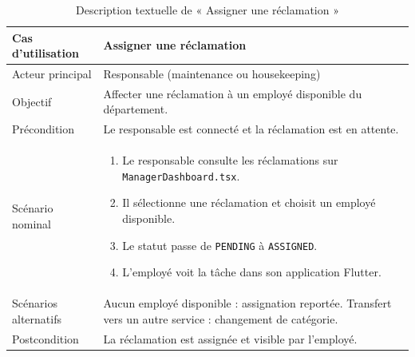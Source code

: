 \begin{table}[H]
\centering
\caption{Description textuelle de « Assigner une réclamation »}
\small
\begin{tabularx}{\textwidth}{|p{3.5cm}|X|}
\hline
Cas d'utilisation & Assigner une réclamation \\ \hline
Acteur principal & Responsable (maintenance ou housekeeping) \\ \hline
Objectif & Affecter une réclamation à un employé disponible du département. \\ \hline
Précondition & Le responsable est connecté et la réclamation est en attente. \\ \hline
Scénario nominal &
\begin{enumerate}[nosep]
\item Le responsable consulte les réclamations sur \texttt{ManagerDashboard.tsx}.
\item Il sélectionne une réclamation et choisit un employé disponible.
\item Le statut passe de \texttt{PENDING} à \texttt{ASSIGNED}.
\item L'employé voit la tâche dans son application Flutter.
\end{enumerate} \\ \hline
Scénarios alternatifs & Aucun employé disponible : assignation reportée. Transfert vers un autre service : changement de catégorie. \\ \hline
Postcondition & La réclamation est assignée et visible par l'employé. \\ \hline
\end{tabularx}
\end{table}

